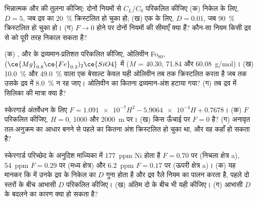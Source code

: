 \begin{exercise}[$\star\star$]\label{exo:b2:magmatic-differentiation:5}
भिन्नात्मक और  की तुलना कीजिए: दोनों नियमों से $C_L/C_0$ परिकलित कीजिए
(क) निकेल के लिए, $D = 5$, जब द्रव का \qty{20}{\percent} क्रिस्टलित हो चुका हो; (ख)
एक  के लिए, $D = 0.01$, जब \qty{90}{\percent} क्रिस्टलित हो चुका हो।
(ग) $F \to 0$ होने पर दोनों नियमों की सीमाएँ क्या हैं? कौन-सा नियम किसी द्रव से
 को पूरी तरह निकाल सकता है?
\end{exercise}

\begin{exercise}[$\star\star$]\label{exo:b2:magmatic-differentiation:6}
(क) ,  और  के द्रव्यमान-प्रतिशत परिकलित कीजिए, ओलिवीन
Fo$_{80}$, $(\ce{Mg}_{0.8}\ce{Fe}_{0.2})_2\ce{SiO4}$ में ($M$ = 40.30, 71.84 और
\qty{60.08}{g/mol})। (ख) \qty{10.0}{\percent}  और
\qty{49.0}{\percent}  वाला एक बेसाल्ट केवल यही ओलिवीन तब तक क्रिस्टलित करता है जब तक उसके द्रव में
\qty{8.0}{\percent}  न रह जाए। ओलिवीन का कितना द्रव्यमान-अंश हटाया गया? (ग) तब
द्रव में सिलिका की मात्रा क्या है?
\end{exercise}

\begin{exercise}[$\star\star$]\label{exo:b2:magmatic-differentiation:7}
स्केरगार्ड अंतर्वेधन के लिए $F = \num{1.091e-7}H^2 - \num{5.9064e-4}H + 0.7678$।
(क) $F$ परिकलित कीजिए, $H = 0$, 1000 और \qty{2000}{m} पर। (ख) किस ऊँचाई पर $F = 0$ है?
(ग) अनावृत तल-अनुक्रम का आधार बनने से पहले  का कितना अंश क्रिस्टलित हो चुका था,
और वह कहाँ हो सकता है?
\end{exercise}

\begin{exercise}[$\star\star$]\label{exo:b2:magmatic-differentiation:8}
स्केरगार्ड परिच्छेद के अनुदिश माध्यिका  में \qty{177}{ppm} Ni होता है
$F = 0.70$ पर (निचला क्षेत्र a), \qty{54}{ppm} $F = 0.29$ पर (मध्य क्षेत्र) और
\qty{6.2}{ppm} $F = 0.17$ पर (ऊपरी क्षेत्र a)। (क) यह मानकर कि  में
उनके द्रव के निकेल का $D$ गुना होता है और द्रव रैले नियम का पालन करता है,
पहले दो स्तरों के बीच आभासी $D$ परिकलित कीजिए। (ख) अंतिम दो के बीच भी यही कीजिए।
(ग) आभासी $D$ के बदलने का कारण क्या हो सकता है?
\end{exercise}

